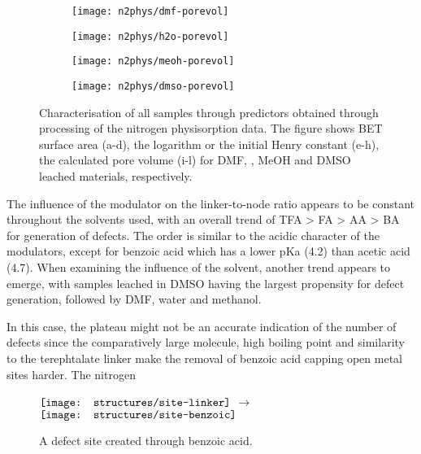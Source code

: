 \begin{figure}[htb]
    \begin{subfigure}{0.25\linewidth}
        \texttt{[image: n2phys/dmf-porevol]}%
        \caption{}%
        \label{def:fgr:n2phys-dmf-porevol}
    \end{subfigure}%
    \begin{subfigure}{0.25\linewidth}
        \texttt{[image: n2phys/h2o-porevol]}%
        \caption{}%
        \label{def:fgr:n2phys-h2o-porevol}
    \end{subfigure}%
    \begin{subfigure}{0.25\linewidth}
        \texttt{[image: n2phys/meoh-porevol]}%
        \caption{}%
        \label{def:fgr:n2phys-meoh-porevol}
    \end{subfigure}%
    \begin{subfigure}{0.25\linewidth}
        \texttt{[image: n2phys/dmso-porevol]}%
        \caption{}%
        \label{def:fgr:n2phys-dmso-porevol}
    \end{subfigure}%

    \caption{Characterisation of all samples through predictors
    obtained through processing of the nitrogen physisorption 
    data. The figure shows BET surface area (a-d), the logarithm
    or the initial Henry constant (e-h), the calculated pore volume 
    (i-l) for DMF, , MeOH and DMSO leached materials,
    respectively.}%
    \label{def:fgr:nitrogen-predictors}
    
\end{figure}

The influence of the modulator on the linker-to-node ratio appears to be
constant throughout the solvents used, with an overall trend of 
TFA > FA > AA > BA for generation of defects. The order is similar
to the acidic character of the modulators, except for 
benzoic acid which has a lower pKa (4.2) than acetic acid (4.7). 
When examining the influence of the solvent, another trend appears
to emerge, with samples leached in DMSO having the largest propensity
for defect generation, followed by DMF, water and methanol.

In this case, the plateau might not be an accurate indication of
the number of defects since the comparatively large molecule,
high boiling point and similarity to the terephtalate linker
make the removal of benzoic acid capping open metal sites harder. 
The nitrogen 

\begin{figure}[!h]
    \centering
    \( \vcenter{\hbox{\texttt{[image: structures/site-linker]}}}\)%
    \( \longrightarrow \)%
    \(\vcenter{\hbox{\texttt{[image: structures/site-benzoic]}}}\)
    \caption{A defect site created through benzoic acid.}%
    \label{def:fgr:benzoic-defect}
\end{figure}
